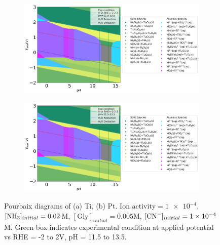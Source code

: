 \documentclass[journal=jacsat,manuscript=article]{achemso}
\begin{document}
\begin{figure}[htbp]
    \centering
    \begin{subfigure}[b]{0.45\textwidth}
        \subcaption{}\label{fig:TiNi_Pourbaix_NH3_Gly}
        \includegraphics[width=\textwidth]{Figures/alloy_pourbaix_diagrams/Ti_Ni_alloy_Ti0.5 Ni0.5_NH3=0.02M_Gly=0.005M_CN=0M_activity=1e-04M.png}
        \par\medskip
    \end{subfigure}
    \begin{subfigure}[b]{0.45\textwidth}
        \subcaption{}\label{fig:TiNi_Pourbaix_NH3_Gly_CN}
        \includegraphics[width=\textwidth]
        {Figures/alloy_pourbaix_diagrams/Ti_Ni_alloy_Ti0.5 Ni0.5_NH3=0.02M_Gly=0.005M_CN=0M_activity=1e-04M.png}
        \par\medskip   
    \end{subfigure}
    \caption{Pourbaix diagrams of (a) Ti, (b) Pt. $\text{Ion activity}=\num{1e-4}$, $[\ce{NH3}]_{initial}= 0.02$M, $[\text{Gly}]_{initial}=0.005$M,  $[\ce{CN-}]_{initial}=\num{1e-4}$M. Green box indicates experimental condition at applied potential vs RHE = -2 to 2V, pH = 11.5 to 13.5.}
    \label{fig:Ti_Pt_Pourbaix}
\end{figure}
\end{document}

